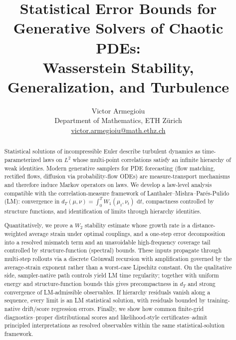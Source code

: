 \documentclass{article}
\numberwithin{equation}{section}
\theoremstyle{plain}
\theoremstyle{definition}
\theoremstyle{remark}
\newcommand{\dd}{\,\mathrm{d}}
\begin{document}

\title{Statistical Error Bounds for Generative Solvers of Chaotic PDEs:\\
Wasserstein Stability, Generalization, and Turbulence}
\author{Victor Armegioiu\\
Department of Mathematics, ETH Z\"urich\\
\href{mailto:victor.armegioiu@math.ethz.ch}{victor.armegioiu@math.ethz.ch}}
\date{}
\maketitle

\begin{abstract}
Statistical solutions of incompressible Euler describe turbulent dynamics as time-parameterized laws on $L^2$ whose
multi-point correlations satisfy an infinite hierarchy of weak identities. Modern generative samplers for PDE forecasting
(flow matching, rectified flows, diffusion via probability-flow ODEs) are measure-transport mechanisms and therefore
induce Markov operators on laws. We develop a law-level analysis compatible with the correlation-measure framework of
Lanthaler--Mishra--Par\'es-Pulido (LM): convergence in
$d_T(\mu,\nu)=\int_0^T W_1(\mu_t,\nu_t)\,\dd t$, compactness controlled by structure functions, and identification of limits
through hierarchy identities.

Quantitatively, we prove a $W_2$ stability estimate whose growth rate is a distance-weighted average strain under optimal
couplings, and a one-step error decomposition into a resolved mismatch term and an unavoidable high-frequency coverage
tail controlled by structure-function (spectral) bounds. These inputs propagate through multi-step rollouts via a
discrete Gr\"onwall recursion with amplification governed by the average-strain exponent rather than a worst-case
Lipschitz constant. On the qualitative side, sampler-native path controls yield LM time regularity; together with uniform
energy and structure-function bounds this gives precompactness in $d_T$ and strong convergence of LM-admissible
observables. If hierarchy residuals vanish along a sequence, every limit is an LM statistical solution, with residuals
bounded by training-native drift/score regression errors. Finally, we show how common finite-grid diagnostics--proper
distributional scores and likelihood-style certificates--admit principled interpretations as resolved observables within
the same statistical-solution framework.
\end{abstract}
\end{document}
